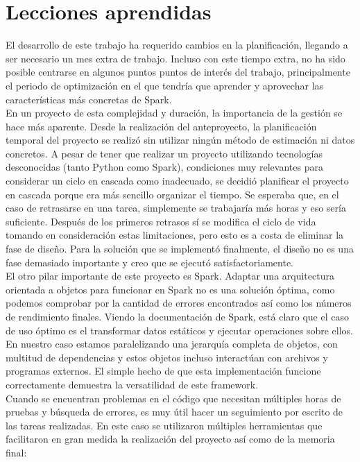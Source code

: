 \section{Lecciones aprendidas}

El desarrollo de este trabajo ha requerido cambios en la planificación, llegando a ser necesario un mes extra de trabajo. Incluso con este tiempo extra, no ha sido posible centrarse en algunos puntos puntos de interés del trabajo, principalmente el periodo de optimización en el que tendría que aprender y aprovechar las características más concretas de Spark. \\

En un proyecto de esta complejidad y duración, la importancia de la gestión se hace más aparente. Desde la realización del anteproyecto, la planificación temporal del proyecto se realizó sin utilizar ningún método de estimación ni datos concretos. A pesar de tener que realizar un proyecto utilizando tecnologías desconocidas (tanto Python como Spark), condiciones muy relevantes para considerar un ciclo en cascada como inadecuado, se decidió planificar el proyecto en cascada porque era más sencillo organizar el tiempo. Se esperaba que, en el caso de retrasarse en una tarea, simplemente se trabajaría más horas y eso sería suficiente. Después de los primeros retrasos sí se modifica el ciclo de vida tomando en consideración estas limitaciones, pero esto es a costa de eliminar la fase de diseño. Para la solución que se implementó finalmente, el diseño no es una fase demasiado importante y creo que se ejecutó satisfactoriamente.\\

El otro pilar importante de este proyecto es Spark. Adaptar una arquitectura orientada a objetos para funcionar en Spark no es una solución óptima, como podemos comprobar por la cantidad de errores encontrados así como los números de rendimiento finales. Viendo la documentación de Spark, está claro que el caso de uso óptimo es el transformar datos estáticos y ejecutar operaciones sobre ellos. En nuestro caso estamos paralelizando una jerarquía completa de objetos, con multitud de dependencias y estos objetos incluso interactúan con archivos y programas externos. El simple hecho de que esta implementación funcione correctamente demuestra la versatilidad de este framework.\\

Cuando se encuentran problemas en el código que necesitan múltiples horas de pruebas y búsqueda de errores, es muy útil hacer un seguimiento por escrito de las tareas realizadas. En este caso se utilizaron múltiples herramientas que facilitaron en gran medida la realización del proyecto así como de la memoria final:

